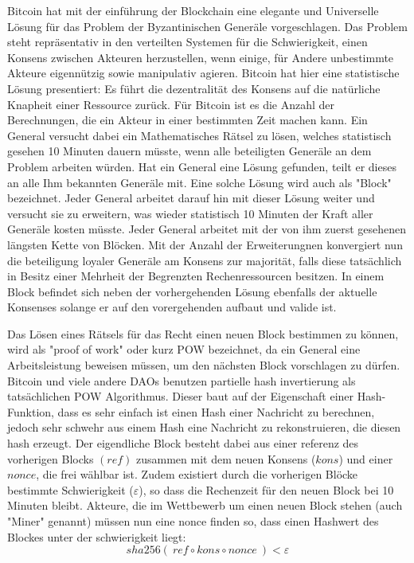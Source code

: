 \documentclass[a4paper,12pt]{article}
\begin{document}
Bitcoin hat mit der einführung der Blockchain eine elegante und Universelle Lösung für das Problem der Byzantinischen Generäle vorgeschlagen. Das Problem steht repräsentativ in den verteilten Systemen für die Schwierigkeit, einen Konsens zwischen Akteuren herzustellen, wenn einige, für Andere unbestimmte Akteure eigennützig sowie manipulativ agieren. 
Bitcoin hat hier eine statistische Lösung presentiert: Es führt die dezentralität des Konsens auf die natürliche Knapheit einer Ressource zurück. Für Bitcoin ist es die Anzahl der Berechnungen, die ein Akteur in einer bestimmten Zeit machen kann. Ein General versucht dabei ein Mathematisches Rätsel zu lösen, welches statistisch gesehen 10 Minuten dauern müsste, wenn alle beteiligten Generäle an dem Problem arbeiten würden. Hat ein General eine Lösung gefunden, teilt er dieses an alle Ihm bekannten Generäle mit. Eine solche Lösung wird auch als "Block" bezeichnet. Jeder General arbeitet darauf hin mit dieser Lösung weiter und versucht sie zu erweitern, was wieder statistisch 10 Minuten der Kraft aller Generäle kosten müsste. Jeder General arbeitet mit der von ihm zuerst gesehenen längsten Kette von Blöcken. Mit der Anzahl der Erweiterungnen konvergiert nun die beteiligung loyaler Generäle am Konsens zur majorität, falls diese tatsächlich in Besitz einer Mehrheit der Begrenzten Rechenressourcen besitzen.
In einem Block befindet sich neben der vorhergehenden Lösung ebenfalls der aktuelle Konsenses solange er auf den vorergehenden aufbaut und valide ist.

Das Lösen eines Rätsels für das Recht einen neuen Block bestimmen zu können, wird als "proof of work" oder kurz POW bezeichnet, da ein General eine Arbeitsleistung beweisen müssen, um den nächsten Block vorschlagen zu dürfen. Bitcoin und viele andere DAOs benutzen partielle hash invertierung als tatsächlichen POW Algorithmus. Dieser baut auf der Eigenschaft einer Hash-Funktion, dass es sehr einfach ist einen Hash einer Nachricht zu berechnen, jedoch sehr schwehr aus einem Hash eine Nachricht zu rekonstruieren, die diesen hash erzeugt. Der eigendliche Block besteht dabei aus einer referenz des vorherigen Blocks $(ref)$ zusammen mit dem neuen Konsens ($kons$) und einer $nonce$, die frei wählbar ist. Zudem existiert durch die vorherigen Blöcke bestimmte Schwierigkeit ($\varepsilon$), so dass die Rechenzeit für den neuen Block bei 10 Minuten bleibt. Akteure, die im Wettbewerb um einen neuen Block stehen (auch "Miner" genannt) müssen nun eine nonce finden so, dass einen Hashwert des Blockes unter der schwierigkeit liegt:
\[ sha256(\ ref\circ kons\circ nonce\ ) < \varepsilon \] 
\end{document}
